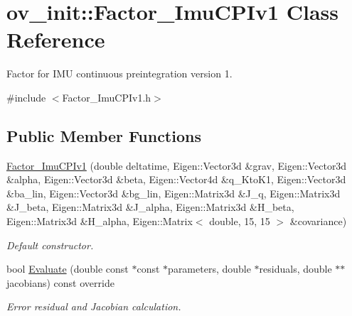 \hypertarget{classov__init_1_1Factor__ImuCPIv1}{}\section{ov\+\_\+init\+:\+:Factor\+\_\+\+Imu\+C\+P\+Iv1 Class Reference}
\label{classov__init_1_1Factor__ImuCPIv1}


Factor for I\+MU continuous preintegration version 1.  




{\ttfamily \#include $<$Factor\+\_\+\+Imu\+C\+P\+Iv1.\+h$>$}

\subsection*{Public Member Functions}
\begin{DoxyCompactItemize}
\item 
\mbox{\label{classov__init_1_1Factor__ImuCPIv1_af3bd5617ca4e6b1b27b71090e7434b61}} 
\hyperlink{classov__init_1_1Factor__ImuCPIv1_af3bd5617ca4e6b1b27b71090e7434b61}{Factor\+\_\+\+Imu\+C\+P\+Iv1} (double deltatime, Eigen\+::\+Vector3d \&grav, Eigen\+::\+Vector3d \&alpha, Eigen\+::\+Vector3d \&beta, Eigen\+::\+Vector4d \&q\+\_\+\+Kto\+K1, Eigen\+::\+Vector3d \&ba\+\_\+lin, Eigen\+::\+Vector3d \&bg\+\_\+lin, Eigen\+::\+Matrix3d \&J\+\_\+q, Eigen\+::\+Matrix3d \&J\+\_\+beta, Eigen\+::\+Matrix3d \&J\+\_\+alpha, Eigen\+::\+Matrix3d \&H\+\_\+beta, Eigen\+::\+Matrix3d \&H\+\_\+alpha, Eigen\+::\+Matrix$<$ double, 15, 15 $>$ \&covariance)
\begin{DoxyCompactList}\small\item\em Default constructor. \end{DoxyCompactList}\item 
bool \hyperlink{classov__init_1_1Factor__ImuCPIv1_a76eebef0897757d9978af82b0f256f28}{Evaluate} (double const $\ast$const $\ast$parameters, double $\ast$residuals, double $\ast$$\ast$jacobians) const override
\begin{DoxyCompactList}\small\item\em Error residual and Jacobian calculation. \end{DoxyCompactList}\end{DoxyCompactItemize}
